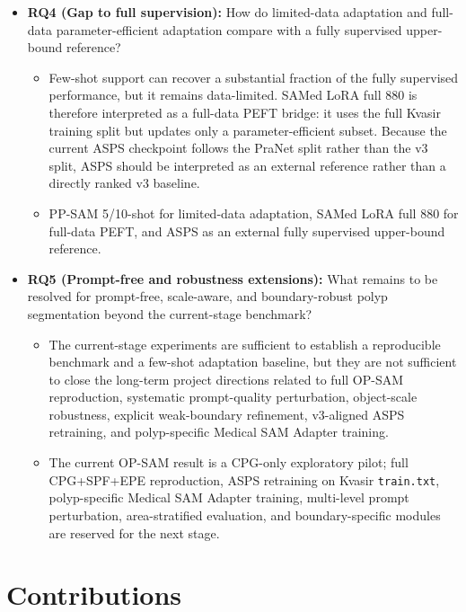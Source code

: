 \begin{itemize}
    \item \textbf{RQ4 (Gap to full supervision):} How do limited-data adaptation and full-data parameter-efficient adaptation compare with a fully supervised upper-bound reference?
    \begin{itemize}
        \item[\textbf{$H_4$:}] Few-shot support can recover a substantial fraction of the fully supervised performance, but it remains data-limited. SAMed LoRA full 880 is therefore interpreted as a full-data PEFT bridge: it uses the full Kvasir training split but updates only a parameter-efficient subset. Because the current ASPS checkpoint follows the PraNet split rather than the v3 split, ASPS should be interpreted as an external reference rather than a directly ranked v3 baseline.
        \item[\emph{Baselines:}] PP-SAM 5/10-shot for limited-data adaptation, SAMed LoRA full 880 for full-data PEFT, and ASPS as an external fully supervised upper-bound reference.
    \end{itemize}

    \item \textbf{RQ5 (Prompt-free and robustness extensions):} What remains to be resolved for prompt-free, scale-aware, and boundary-robust polyp segmentation beyond the current-stage benchmark?
    \begin{itemize}
        \item[\textbf{$H_5$:}] The current-stage experiments are sufficient to establish a reproducible benchmark and a few-shot adaptation baseline, but they are not sufficient to close the long-term project directions related to full OP-SAM reproduction, systematic prompt-quality perturbation, object-scale robustness, explicit weak-boundary refinement, v3-aligned ASPS retraining, and polyp-specific Medical SAM Adapter training.
        \item[\emph{Baselines and plans:}] The current OP-SAM result is a CPG-only exploratory pilot; full CPG+SPF+EPE reproduction, ASPS retraining on Kvasir \texttt{train.txt}, polyp-specific Medical SAM Adapter training, multi-level prompt perturbation, area-stratified evaluation, and boundary-specific modules are reserved for the next stage.
    \end{itemize}
\end{itemize}

\section{Contributions}
\label{sec:contributions}

